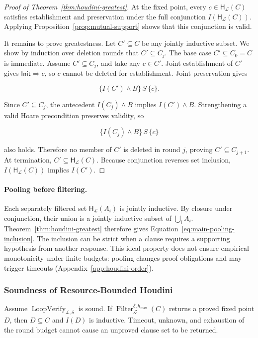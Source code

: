\begin{proof}[Proof of Theorem~\ref{thm:houdini-greatest}]
At the fixed point, every \(c\in\mathsf H_{\mathcal L}(C)\) satisfies
establishment and preservation under the full conjunction
\(I(\mathsf H_{\mathcal L}(C))\).  Applying
Proposition~\ref{prop:mutual-support} shows that this conjunction is valid.

It remains to prove greatestness.  Let \(C'\subseteq C\) be any jointly
inductive subset.  We show by induction over deletion rounds that
\(C'\subseteq C_j\).  The base case \(C'\subseteq C_0=C\) is immediate.  Assume
\(C'\subseteq C_j\), and take any \(c\in C'\).  Joint establishment of \(C'\)
gives \(\mathsf{Init}\Rightarrow c\), so \(c\) cannot be deleted for establishment.  Joint
preservation gives

\[
  \{I(C')\wedge B\}\,S\,\{c\}.
\]

Since \(C'\subseteq C_j\), the antecedent \(I(C_j)\wedge B\) implies
\(I(C')\wedge B\).  Strengthening a valid Hoare precondition preserves
validity, so

\[
  \{I(C_j)\wedge B\}\,S\,\{c\}
\]

also holds.  Therefore no member of \(C'\) is deleted in round \(j\), proving
\(C'\subseteq C_{j+1}\).  At termination,
\(C'\subseteq\mathsf H_{\mathcal L}(C)\).  Because conjunction reverses set
inclusion, \(I(\mathsf H_{\mathcal L}(C))\) implies \(I(C')\).
\end{proof}

\paragraph{Pooling before filtering.}
Each separately filtered set \(\mathsf H_{\mathcal L}(A_i)\) is jointly
inductive.  By closure under conjunction, their union is a jointly inductive
subset of \(\bigcup_i A_i\).  Theorem~\ref{thm:houdini-greatest} therefore
gives Equation~\eqref{eq:main-pooling-inclusion}.  The inclusion can be strict
when a clause requires a supporting hypothesis from another response.
This ideal property does not ensure empirical monotonicity under finite
budgets: pooling changes proof obligations and may trigger timeouts
(Appendix~\ref{app:houdini-order}).

\subsubsection{Soundness of Resource-Bounded Houdini}

\begin{proposition}
\label{prop:bounded-houdini-sound}
Assume \(\operatorname{LoopVerify}_{\mathcal L,\delta}\) is sound.  If
\(\operatorname{Filter}_{\mathcal L}^{\delta,h_{\max}}(C)\) returns a proved
fixed point \(D\), then \(D\subseteq C\) and \(I(D)\) is inductive.  Timeout,
unknown, and exhaustion of the round budget cannot cause an unproved clause
set to be returned.
\end{proposition}

